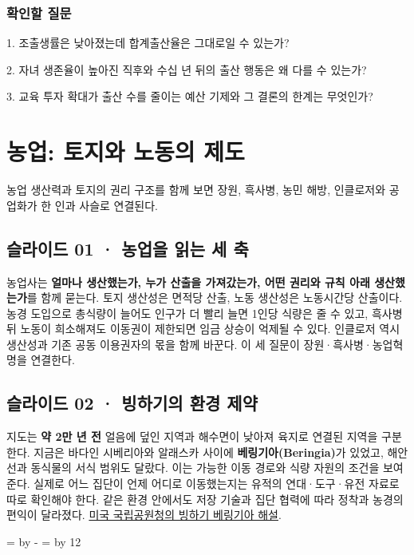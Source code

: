 \documentclass[10pt,a4paper]{article}
\newcommand{\ReserveQuestionSpace}{%
  \par\begingroup
  \dimen0=\pagegoal \advance\dimen0 by -\pagetotal
  \dimen2=\baselineskip \multiply\dimen2 by 12
  \ifdim\dimen0<\dimen2 \newpage\fi
  \endgroup}
\begin{document}
\subsubsection*{확인할 질문}

1. 조출생률은 낮아졌는데 합계출산율은 그대로일 수 있는가?\par
2. 자녀 생존율이 높아진 직후와 수십 년 뒤의 출산 행동은 왜 다를 수 있는가?\par
3. 교육 투자 확대가 출산 수를 줄이는 예산 기제와 그 결론의 한계는 무엇인가?\par


\section{농업: 토지와 노동의 제도}
농업 생산력과 토지의 권리 구조를 함께 보면 장원, 흑사병, 농민 해방, 인클로저와 공업화가 한 인과 사슬로 연결된다.\par

\subsection{슬라이드 01 · 농업을 읽는 세 축}
농업사는 \textbf{얼마나 생산했는가, 누가 산출을 가져갔는가, 어떤 권리와 규칙 아래 생산했는가}를 함께 묻는다. 토지 생산성은 면적당 산출, 노동 생산성은 노동시간당 산출이다. 농경 도입으로 총식량이 늘어도 인구가 더 빨리 늘면 1인당 식량은 줄 수 있고, 흑사병 뒤 노동이 희소해져도 이동권이 제한되면 임금 상승이 억제될 수 있다. 인클로저 역시 생산성과 기존 공동 이용권자의 몫을 함께 바꾼다. 이 세 질문이 장원·흑사병·농업혁명을 연결한다.\par

\subsection{슬라이드 02 · 빙하기의 환경 제약}
지도는 \textbf{약 2만 년 전} 얼음에 덮인 지역과 해수면이 낮아져 육지로 연결된 지역을 구분한다. 지금은 바다인 시베리아와 알래스카 사이에 \textbf{베링기아(Beringia)}가 있었고, 해안선과 동식물의 서식 범위도 달랐다. 이는 가능한 이동 경로와 식량 자원의 조건을 보여 준다. 실제로 어느 집단이 언제 어디로 이동했는지는 유적의 연대·도구·유전 자료로 따로 확인해야 한다. 같은 환경 안에서도 저장 기술과 집단 협력에 따라 정착과 농경의 편익이 달라졌다. \href{https://www.nps.gov/subjects/beringia/about.htm}{미국 국립공원청의 빙하기 베링기아 해설}.\par

\ReserveQuestionSpace
\end{document}
